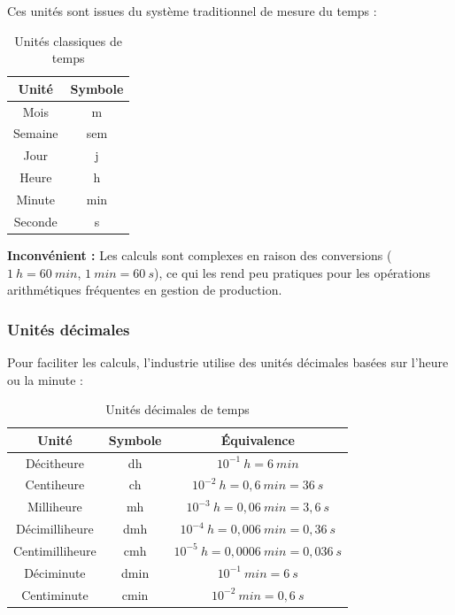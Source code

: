 \documentclass[a4paper,12pt]{article}
\begin{document}
Ces unités sont issues du système traditionnel de mesure du temps :

\begin{table}[ht]
\centering
\begin{tabular}{|c|c|}
\hline
\textbf{Unité} & \textbf{Symbole} \\
\hline
Mois & m \\
Semaine & sem \\
Jour & j \\
Heure & h \\
Minute & min \\
Seconde & s \\
\hline
\end{tabular}
\caption{Unités classiques de temps}
\end{table}

\textbf{Inconvénient :} Les calculs sont complexes en raison des conversions ($1\ h = 60\ min$, $1\ min = 60\ s$), ce qui les rend peu pratiques pour les opérations arithmétiques fréquentes en gestion de production.

\subsubsection{Unités décimales}

Pour faciliter les calculs, l'industrie utilise des unités décimales basées sur l'heure ou la minute :

\begin{table}[ht]
\centering
\begin{tabular}{|c|c|c|}
\hline
\textbf{Unité} & \textbf{Symbole} & \textbf{Équivalence} \\
\hline
Décitheure & dh & $10^{-1}\ h = 6\ min$ \\
Centiheure & ch & $10^{-2}\ h = 0,6\ min = 36\ s$ \\
Milliheure & mh & $10^{-3}\ h = 0,06\ min = 3,6\ s$ \\
Décimilliheure & dmh & $10^{-4}\ h = 0,006\ min = 0,36\ s$ \\
Centimilliheure & cmh & $10^{-5}\ h = 0,0006\ min = 0,036\ s$ \\
\hline
Déciminute & dmin & $10^{-1}\ min = 6\ s$ \\
Centiminute & cmin & $10^{-2}\ min = 0,6\ s$ \\
\hline
\end{tabular}
\caption{Unités décimales de temps}
\end{table}

\begin{center}
\end{center}
\end{document}
